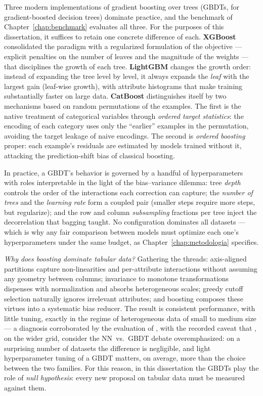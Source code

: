 Three modern implementations of gradient boosting over trees
(GBDTs, for gradient-boosted decision trees) dominate practice, and
the benchmark of Chapter~\ref{chap:benchmark} evaluates all three.
For the purposes of this dissertation, it suffices to retain one
concrete difference of each. \textbf{XGBoost} \citep{chen2016}
consolidated the paradigm with a regularized formulation of the
objective --- explicit penalties on the number of leaves and the
magnitude of the weights --- that disciplines the growth of each
tree. \textbf{LightGBM} \citep{ke2017} changes the growth order:
instead of expanding the tree level by level, it always expands the
\emph{leaf} with the largest gain (leaf-wise growth), with attribute
histograms that make training substantially faster on large data.
\textbf{CatBoost} \citep{prokhorenkova2018} distinguishes itself by
two mechanisms based on random permutations of the examples. The
first is the native treatment of categorical variables through
\emph{ordered target statistics}: the encoding of each category uses
only the ``earlier'' examples in the permutation, avoiding the
target leakage of naive encodings. The second is \emph{ordered
boosting} proper: each example's residuals are estimated by models
trained without it, attacking the prediction-shift bias of classical
boosting.

In practice, a GBDT's behavior is governed by a handful of
hyperparameters with roles interpretable in the light of the
bias--variance dilemma: tree \emph{depth} controls the order of the
interactions each correction can capture; the \emph{number of
trees} and the \emph{learning rate} form a coupled pair (smaller
steps require more steps, but regularize); and the row and column
\emph{subsampling} fractions per tree inject the decorrelation that
bagging taught. No configuration dominates all datasets --- which
is why any fair comparison between models must optimize each one's
hyperparameters under the same budget, as
Chapter~\ref{chap:metodologia} specifies.

\emph{Why does boosting dominate tabular data?} Gathering the
threads: axis-aligned partitions capture non-linearities and
per-attribute interactions without assuming any geometry between
columns; invariance to monotone transformations dispenses with
normalization and absorbs heterogeneous scales; greedy cutoff
selection naturally ignores irrelevant attributes; and boosting
composes these virtues into a systematic bias reducer. The result
is consistent performance, with little tuning, exactly in the
regime of heterogeneous data of small to medium size --- a
diagnosis corroborated by the evaluation of
\citet{grinsztajn2022}, with the recorded caveat that
\citet{mcelfresh2023}, on the wider grid, consider the NN~vs.\ GBDT
debate overemphasized: on a surprising number of datasets the
difference is negligible, and light hyperparameter tuning of a GBDT
matters, on average, more than the choice between the two families.
For this reason, in this dissertation the GBDTs play the role of
\emph{null hypothesis}: every new proposal on tabular data must be
measured against them.

